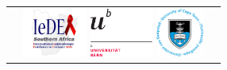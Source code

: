 \documentclass[paperwidth=137.2cm,paperheight=91.4cm]{baposter}
\begin{document}
\begin{poster}
{\begin{tabular}{p{.4\linewidth}p{.4\linewidth}|p{.2\linewidth}}
		&
		\vspace{-.4em}
		\includegraphics[height=1.6cm]{figures/ideasa.jpg} \hspace{.5em} \includegraphics[height=1.6cm]{figures/ublogo.pdf}\hspace{.5em}  \includegraphics[height=1.6cm]{figures/logo_uct.png} \hspace{1em} \\
		
\end{tabular}
\vspace{-.4em}
}


\end{poster}
\end{document}

